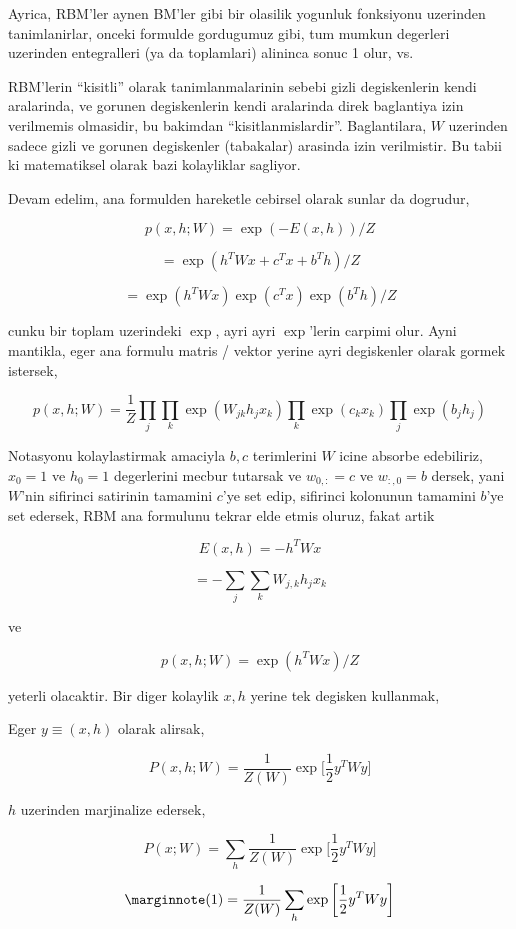 \documentclass[12pt,fleqn]{article}\usepackage{../common}
\begin{document}
Ayrica, RBM'ler aynen BM'ler gibi bir olasilik yogunluk fonksiyonu
uzerinden tanimlanirlar, onceki formulde gordugumuz gibi, tum mumkun
degerleri uzerinden entegralleri (ya da toplamlari) alininca sonuc 1 olur,
vs.

RBM'lerin ``kisitli'' olarak tanimlanmalarinin sebebi gizli degiskenlerin
kendi aralarinda, ve gorunen degiskenlerin kendi aralarinda direk
baglantiya izin verilmemis olmasidir, bu bakimdan
``kisitlanmislardir''. Baglantilara, $W$ uzerinden sadece gizli ve gorunen
degiskenler (tabakalar) arasinda izin verilmistir. Bu tabii ki matematiksel
olarak bazi kolayliklar sagliyor.

Devam edelim, ana formulden hareketle cebirsel olarak sunlar da dogrudur,

$$ p(x,h;W) = \exp (-E(x,h)) / Z $$

$$ = \exp (h^TWx + c^Tx + b^Th ) / Z $$

$$ = \exp (h^TWx) \exp (c^Tx) \exp(b^Th) / Z $$

cunku bir toplam uzerindeki $\exp$, ayri ayri $\exp$'lerin carpimi
olur. Ayni mantikla, eger ana formulu matris / vektor yerine ayri
degiskenler olarak gormek istersek,

$$ 
p(x,h;W) = \frac{1}{Z}
\prod_j \prod_k \exp (W_{jk}h_jx_k) \prod_k \exp(c_kx_k) \prod_j \exp(b_jh_j) 
 $$

Notasyonu kolaylastirmak amaciyla $b,c$ terimlerini $W$ icine absorbe
edebiliriz, $x_0=1$ ve $h_0=1$ degerlerini mecbur tutarsak ve $w_{0,:}=c$
ve $w_{:,0}=b$ dersek, yani $W$'nin sifirinci satirinin tamamini $c$'ye set
edip, sifirinci kolonunun tamamini $b$'ye set edersek, RBM ana formulunu
tekrar elde etmis oluruz, fakat artik 

$$ E(x,h) = -h^TWx $$


$$ = - \sum_j \sum_k W_{j,k}h_jx_k  $$

ve

$$ p(x,h;W)  = \exp (h^TWx) / Z $$

yeterli olacaktir. Bir diger kolaylik $x,h$ yerine tek degisken kullanmak,

Eger $y \equiv (x,h)$ olarak alirsak, 


$$ P(x,h;W) = \frac{1}{Z(W)} \exp 
\bigg[ 
\frac{1}{2} y^T W y
\bigg]
$$

$h$ uzerinden marjinalize edersek,

$$ P(x;W) = \sum_h \frac{1}{Z(W)} \exp 
\bigg[ 
\frac{1}{2} y^T W y
\bigg]
$$


$$  
\mlabel{1}
= \frac{1}{Z(W)}  \sum_h \exp 
\bigg[ 
\frac{1}{2} y^T W y
\bigg]
$$
\end{document}
